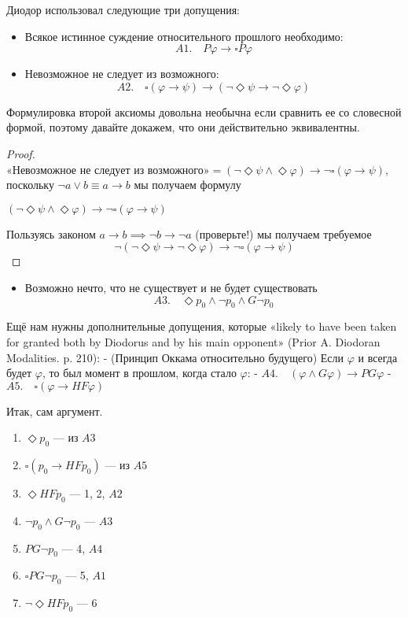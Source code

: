 \documentclass[openany]{book}
\theoremstyle{plain}
\theoremstyle{definition}
\begin{document}
Диодор использовал следующие три допущения:

\begin{itemize}
\item Всякое истинное суждение относительного прошлого необходимо:
    \[A1. \quad P\varphi \to \square P\varphi \]
\item Невозможное не следует из возможного:
    \[A2. \quad \square(\varphi \to \psi) \to (\neg \Diamond \psi \to \neg \Diamond \varphi)\]
\end{itemize}

Формулировка второй аксиомы довольна необычна если сравнить ее со словесной формой, поэтому давайте докажем, что они действительно эквивалентны.
\begin{proof}

\(\text{«Невозможное не следует из возможного»} = (\neg \Diamond \psi \land \Diamond \varphi) \to \neg \square (\varphi \to \psi)\), поскольку \(\neg a \lor b \equiv a \to b\) мы получаем формулу

\((\neg \Diamond \psi \land \Diamond \varphi) \to \neg \square (\varphi \to \psi)\)

Пользуясь законом \(a \to b \implies \neg b \to \neg a\) (проверьте!) мы получаем требуемое
$$\neg(\neg \Diamond \psi \to \neg \Diamond \varphi) \to \neg \square (\varphi \to \psi)$$
\end{proof}
\begin{itemize}
\item Возможно нечто, что не существует и не будет существовать
    \[A3. \quad \Diamond p_0 \land \neg p_0 \land G\neg p_0\]
 \end{itemize}

Ещё нам нужны дополнительные допущения, которые «likely to have been taken for granted both by Diodorus and by his main opponent» (Prior A. Diodoran Modalities. p. 210):
- (Принцип Оккама относительно будущего) Если \(\varphi\) и всегда будет \(\varphi\), то был момент в прошлом, когда стало \(\varphi\):
    - \(A4. \quad (\varphi \land G \varphi) \to PG\varphi\) 
- \(A5. \quad \square(\varphi \to HF \varphi)\)

Итак, сам аргумент.
\begin{enumerate}
\item \(\Diamond p_0\) — из \(A3\)
\item \(\square(p_0 \to HF p_0)\) — из \(A5\)
\item \(\Diamond HF p_0\) — 1, 2, \(A2\)
\item \(\neg p_0 \land G \neg p_0\) — \(A3\)
\item \(PG \neg p_0\) — 4, \(A4\)
\item \(\square PG \neg p_0\) — 5, \(A1\)
\item \(\neg \Diamond HF p_0\) — 6
\end{enumerate}
\end{document}
